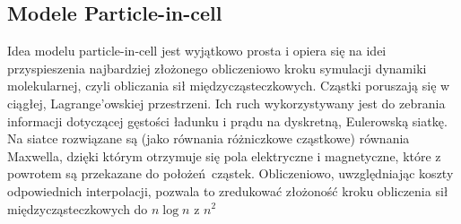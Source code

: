    \subsection{Modele Particle-in-cell}

    Idea modelu particle-in-cell jest wyjątkowo prosta i opiera się na idei przyspieszenia najbardziej złożonego obliczeniowo kroku
    symulacji dynamiki molekularnej, czyli obliczania sił międzycząsteczkowych. Cząstki poruszają się w ciągłej, Lagrange'owskiej przestrzeni.
    Ich ruch wykorzystywany jest do zebrania informacji dotyczącej gęstości ładunku i prądu na dyskretną, Eulerowską siatkę. Na siatce rozwiązane
    są (jako równania różniczkowe cząstkowe) równania Maxwella, dzięki którym otrzymuje się pola elektryczne i magnetyczne, które z powrotem są przekazane
    do położeń cząstek. Obliczeniowo, uwzględniając koszty odpowiednich interpolacji, pozwala to zredukować złożoność kroku obliczenia sił międzycząsteczkowych
    do $n \log{n}$ z $n^2$ 

